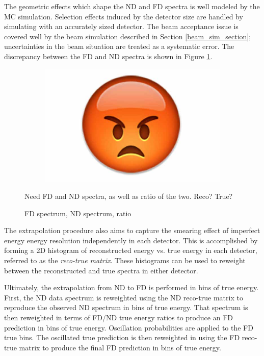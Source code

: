 The geometric effects which shape the ND and FD spectra is well modeled
by the MC simulation.
Selection effects induced by the detector size are handled by simulating
with an accurately sized detector.
The beam acceptance issue is covered well by the beam simulation described in
Section \ref{beam_sim_section}; uncertainties in the beam situation are
treated as a systematic error.
The discrepancy between the FD and ND spectra is shown in Figure
\ref{ratioNDFD}.

\begin{figure}
\begin{center}
  \begin{subfigure}[b]{0.45\textwidth}
    \centering
    \includegraphics[width=\textwidth]{figures/dummy/dummy}
  \end{subfigure}

\end{center}
\caption{FD spectrum, ND spectrum, ratio}{
Need FD and ND spectra, as well as ratio of the two.  Reco?  True?
}
\label{ratioNDFD}
\end{figure}

The extrapolation procedure also aims to capture the smearing effect of
imperfect energy energy resolution independently in each detector.
This is accomplished by forming a 2D histogram of reconstructed energy
vs. true energy in each detector, referred to as the \textit{reco-true matrix}.
These histograms can be used to reweight between the reconstructed
and true spectra in either detector.

Ultimately, the extrapolation from ND to FD is performed in bins of true energy.
First, the ND data spectrum is reweighted using the ND reco-true matrix
to reproduce the observed ND spectrum in bins of true energy.
That spectrum is then reweighted in terms of FD/ND true energy ratios to
produce an FD prediction in bins of true energy.
Oscillation probabilities are applied to the FD true bins.
The oscillated true prediction is then reweighted in using the FD reco-true
matrix to produce the final FD prediction in bins of true energy.



